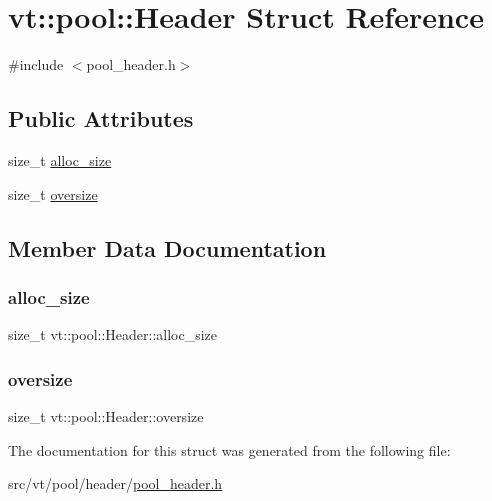 \hypertarget{structvt_1_1pool_1_1_header}{}\section{vt\+:\+:pool\+:\+:Header Struct Reference}
\label{structvt_1_1pool_1_1_header}


{\ttfamily \#include $<$pool\+\_\+header.\+h$>$}

\subsection*{Public Attributes}
\begin{DoxyCompactItemize}
\item 
size\+\_\+t \hyperlink{structvt_1_1pool_1_1_header_ad1f8e915eee733cd6b4d8efbfe51d551}{alloc\+\_\+size}
\item 
size\+\_\+t \hyperlink{structvt_1_1pool_1_1_header_ac3271e96a2c67c907795aa172b3f70cb}{oversize}
\end{DoxyCompactItemize}


\subsection{Member Data Documentation}
\mbox{\label{structvt_1_1pool_1_1_header_ad1f8e915eee733cd6b4d8efbfe51d551}} 
\subsubsection{\texorpdfstring{alloc\+\_\+size}{alloc\_size}}
{\footnotesize\ttfamily size\+\_\+t vt\+::pool\+::\+Header\+::alloc\+\_\+size}

\mbox{\label{structvt_1_1pool_1_1_header_ac3271e96a2c67c907795aa172b3f70cb}} 
\subsubsection{\texorpdfstring{oversize}{oversize}}
{\footnotesize\ttfamily size\+\_\+t vt\+::pool\+::\+Header\+::oversize}



The documentation for this struct was generated from the following file\+:\begin{DoxyCompactItemize}
\item 
src/vt/pool/header/\hyperlink{pool__header_8h}{pool\+\_\+header.\+h}\end{DoxyCompactItemize}
